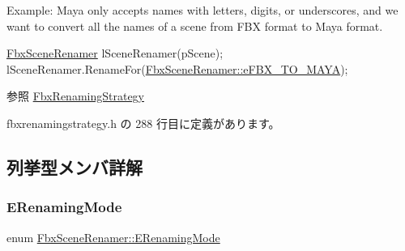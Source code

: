 Example\+: Maya only accepts names with letters, digits, or underscores, and we want to convert all the names of a scene from F\+BX format to Maya format. 
\begin{DoxyCode}
\hyperlink{class_fbx_scene_renamer}{FbxSceneRenamer} lSceneRenamer(pScene);
lSceneRenamer.RenameFor(\hyperlink{class_fbx_scene_renamer_a9279ee1a645d6499b934adbc376f8678aae982f344936a216dcab27151b49d265}{FbxSceneRenamer::eFBX\_TO\_MAYA});
\end{DoxyCode}


\begin{DoxySeeAlso}{参照}
\hyperlink{class_fbx_renaming_strategy}{Fbx\+Renaming\+Strategy} 
\end{DoxySeeAlso}


 fbxrenamingstrategy.\+h の 288 行目に定義があります。



\subsection{列挙型メンバ詳解}
\mbox{\label{class_fbx_scene_renamer_a9279ee1a645d6499b934adbc376f8678}} 
\subsubsection{\texorpdfstring{E\+Renaming\+Mode}{ERenamingMode}}
{\footnotesize\ttfamily enum \hyperlink{class_fbx_scene_renamer_a9279ee1a645d6499b934adbc376f8678}{Fbx\+Scene\+Renamer\+::\+E\+Renaming\+Mode}}

